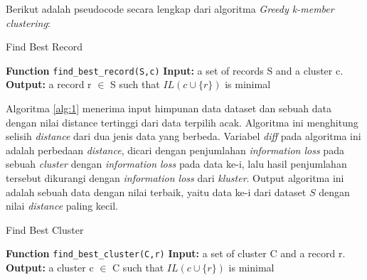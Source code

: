 \noindent Berikut adalah pseudocode secara lengkap dari algoritma \textit{Greedy k-member clustering}:

\begin{algorithm}[H]
  \caption{Find Best Record}\label{alg:1}
  \begin{algorithmic}[1]
  \State \textbf{Function} \texttt{find\_best\_record(S,c)}
  \State \textbf{Input:} a set of records S and a cluster c.
  \State \textbf{Output:} a record r $\in$ S such that $IL(c \cup \{r\})$ is minimal
  \\
  \EndIf
  \EndFor
  \end{algorithmic}
\end{algorithm}
Algoritma \ref{alg:1} menerima input himpunan data dataset dan sebuah data dengan nilai distance tertinggi dari data terpilih acak. Algoritma ini menghitung selisih \textit{distance} dari dua jenis data yang berbeda. Variabel \textit{diff} pada algoritma ini adalah perbedaan \textit{distance}, dicari dengan penjumlahan \textit{information loss} pada sebuah \textit{cluster} dengan \textit{information loss} pada data ke-i, lalu hasil penjumlahan tersebut dikurangi dengan \textit{information loss} dari \textit{kluster}. Output algoritma ini adalah sebuah data dengan nilai terbaik, yaitu data ke-i dari dataset $S$ dengan nilai \textit{distance} paling kecil.
\begin{algorithm}[H]
  \caption{Find Best Cluster}\label{alg:2}
  \begin{algorithmic}[1]
  \State \textbf{Function} \texttt{find\_best\_cluster(C,r)}
  \State \textbf{Input:} a set of cluster C and a record r.
  \State \textbf{Output:} a cluster c $\in$ C such that $IL(c \cup \{r\})$ is minimal
  \\
  \EndIf
  \EndFor
  \end{algorithmic}
\end{algorithm}

